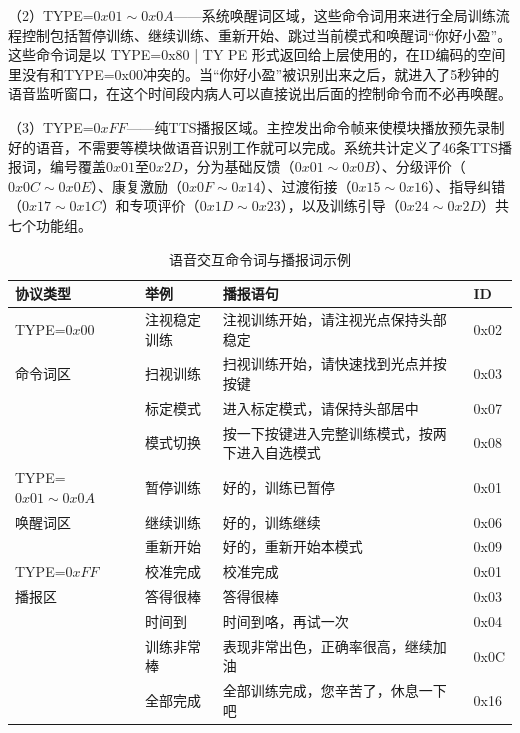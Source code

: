 （2）TYPE=$0x01\sim0x0A$——系统唤醒词区域，这些命令词用来进行全局训练流程控制包括暂停训练、继续训练、重新开始、跳过当前模式和唤醒词“你好小盈”。这些命令词是以 TYPE=0x80 | TY PE 形式返回给上层使用的，在ID编码的空间里没有和TYPE=0x00冲突的。当“你好小盈”被识别出来之后，就进入了5秒钟的语音监听窗口，在这个时间段内病人可以直接说出后面的控制命令而不必再唤醒。

（3）TYPE=$0xFF$——纯TTS播报区域。主控发出命令帧来使模块播放预先录制好的语音，不需要等模块做语音识别工作就可以完成。系统共计定义了46条TTS播报词，编号覆盖$0x01$至$0x2D$，分为基础反馈（$0x01\sim0x0B$）、分级评价（$0x0C\sim0x0E$）、康复激励（$0x0F\sim0x14$）、过渡衔接（$0x15\sim0x16$）、指导纠错（$0x17\sim0x1C$）和专项评价（$0x1D\sim0x23$），以及训练引导（$0x24\sim0x2D$）共七个功能组。

\begin{table}[h!]
\centering
\caption{语音交互命令词与播报词示例}
\label{tab:voice_examples}
\begin{tabular}{p{2.5cm} p{3cm} p{6.0cm} p{1.2cm}}
\toprule[1.5pt]
\textbf{协议类型} & \textbf{举例} & \textbf{播报语句} & \textbf{ID} \\
\midrule[0.75pt]
TYPE=$0x00$ & 注视稳定训练 & 注视训练开始，请注视光点保持头部稳定 & 0x02 \\
 命令词区 & 扫视训练 & 扫视训练开始，请快速找到光点并按按键 & 0x03 \\
            & 标定模式 & 进入标定模式，请保持头部居中 & 0x07 \\
            & 模式切换 & 按一下按键进入完整训练模式，按两下进入自选模式 & 0x08 \\
\midrule[0.75pt]
TYPE=$0x01\sim0x0A$ & 暂停训练 & 好的，训练已暂停 & 0x01 \\
 唤醒词区 & 继续训练 & 好的，训练继续 & 0x06 \\
                   & 重新开始 & 好的，重新开始本模式 & 0x09 \\
\midrule[0.75pt]
TYPE=$0xFF$ & 校准完成 & 校准完成 & 0x01 \\
 播报区 & 答得很棒 & 答得很棒 & 0x03 \\
            & 时间到 & 时间到咯，再试一次 & 0x04 \\
            & 训练非常棒 & 表现非常出色，正确率很高，继续加油 & 0x0C \\
            & 全部完成 & 全部训练完成，您辛苦了，休息一下吧 & 0x16 \\
\bottomrule[1.5pt]
\end{tabular}
\end{table}

